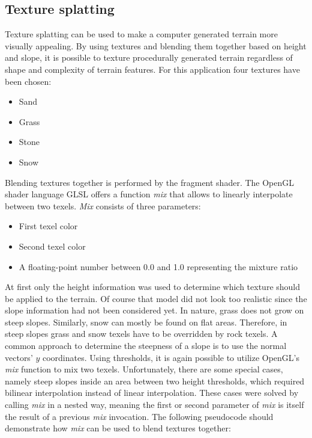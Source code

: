 \documentclass[11pt,a4paper,twoside,openright]{report}
\begin{document}
\subsection{Texture splatting}
Texture splatting can be used to make a computer generated terrain more visually appealing. By using textures and blending them together based on height and slope, it is possible to texture procedurally generated terrain regardless of shape and complexity of terrain features. For this application four textures have been chosen:
\begin{itemize}
\item Sand
\item Grass
\item Stone
\item Snow
\end{itemize}
Blending textures together is performed by the fragment shader. The OpenGL shader language GLSL offers a function \emph{mix} that allows to linearly interpolate between two texels. \emph{Mix} consists of three parameters:
\begin{itemize}
\item First texel color
\item Second texel color
\item A floating-point number between 0.0 and 1.0 representing the mixture ratio
\end{itemize}
At first only the height information was used to determine which texture should be applied to the terrain. Of course that model did not look too realistic since the slope information had not been considered yet. In nature, grass does not grow on steep slopes. Similarly, snow can mostly be found on flat areas. Therefore, in steep slopes grass and snow texels have to be overridden by rock texels. A common approach to determine the steepness of a slope is to use the normal vectors' $y$ coordinates. Using thresholds, it is again possible to utilize OpenGL's \emph{mix} function to mix two texels. Unfortunately, there are some special cases, namely steep slopes inside an area between two height thresholds, which required bilinear interpolation instead of linear interpolation. These cases were solved by calling \emph{mix} in a nested way, meaning the first or second parameter of \emph{mix} is itself the result of a previous \emph{mix} invocation. The following pseudocode should demonstrate how \emph{mix} can be used to blend textures together:
\end{document}
